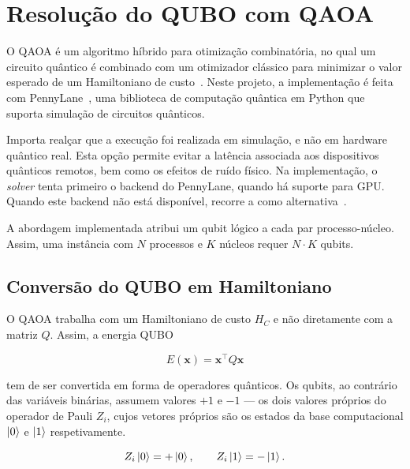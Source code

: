 \chapter{Resolução do QUBO com QAOA}
\label{chap:resolucao-qubo-qaoa}

O \acs{QAOA} é um algoritmo híbrido para otimização combinatória, no qual
um circuito quântico é combinado com um otimizador clássico para
minimizar o valor esperado de um Hamiltoniano de custo~\cite{Farhi2014QAOA,Cerezo2021VQA}.
Neste projeto, a implementação é feita com PennyLane~\cite{Bergholm2018PennyLane},
uma biblioteca de computação quântica em Python que suporta simulação de circuitos quânticos.

Importa realçar que a execução foi realizada em simulação, e não em hardware
quântico real. Esta opção permite evitar a latência associada aos dispositivos
quânticos remotos, bem como os efeitos de ruído físico. Na implementação, o \textit{solver}
tenta primeiro o backend  do PennyLane, quando há suporte para
\acs{GPU}. Quando este backend não está disponível, recorre a 
como alternativa~\cite{Asadi2024Lightning}.

A abordagem implementada atribui um qubit lógico a cada par processo-núcleo. Assim,
uma instância com $N$ processos e $K$ núcleos requer $N \cdot K$ qubits.

\section{Conversão do QUBO em Hamiltoniano}
\label{sec:conversao-qubo-hamiltoniano}

O \acs{QAOA} trabalha com um Hamiltoniano de custo $H_C$ e não diretamente com a
matriz $Q$. Assim, a energia \acs{QUBO}

\begin{equation}
    E(\mathbf{x}) = \mathbf{x}^{\top}Q\mathbf{x}
\end{equation}

tem de ser convertida em forma de operadores quânticos.
Os qubits, ao contrário das variáveis binárias, assumem valores $+1$ e $-1$ ---
os dois valores próprios do operador de Pauli $Z_i$, cujos vetores próprios são
os estados da base computacional $\ket{0}$ e $\ket{1}$ respetivamente.

\begin{equation}
    Z_i \ket{0} = +\ket{0}, \qquad
    Z_i \ket{1} = -\ket{1}.
\end{equation}

